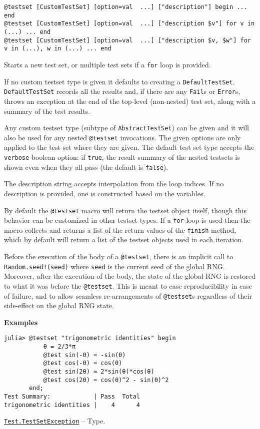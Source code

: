 \begin{adjustwidth}{2em}{0pt}


\begin{verbatim}
@testset [CustomTestSet] [option=val  ...] ["description"] begin ... end
@testset [CustomTestSet] [option=val  ...] ["description $v"] for v in (...) ... end
@testset [CustomTestSet] [option=val  ...] ["description $v, $w"] for v in (...), w in (...) ... end
\end{verbatim}

Starts a new test set, or multiple test sets if a \texttt{for} loop is provided.

If no custom testset type is given it defaults to creating a \texttt{DefaultTestSet}. \texttt{DefaultTestSet} records all the results and, if there are any \texttt{Fail}s or \texttt{Error}s, throws an exception at the end of the top-level (non-nested) test set, along with a summary of the test results.

Any custom testset type (subtype of \texttt{AbstractTestSet}) can be given and it will also be used for any nested \texttt{@testset} invocations. The given options are only applied to the test set where they are given. The default test set type accepts the \texttt{verbose} boolean option: if \texttt{true}, the result summary of the nested testsets is shown even when they all pass (the default is \texttt{false}).

The description string accepts interpolation from the loop indices. If no description is provided, one is constructed based on the variables.

By default the \texttt{@testset} macro will return the testset object itself, though this behavior can be customized in other testset types. If a \texttt{for} loop is used then the macro collects and returns a list of the return values of the \texttt{finish} method, which by default will return a list of the testset objects used in each iteration.

Before the execution of the body of a \texttt{@testset}, there is an implicit call to \texttt{Random.seed!(seed)} where \texttt{seed} is the current seed of the global RNG. Moreover, after the execution of the body, the state of the global RNG is restored to what it was before the \texttt{@testset}. This is meant to ease reproducibility in case of failure, and to allow seamless re-arrangements of \texttt{@testset}s regardless of their side-effect on the global RNG state.

\textbf{Examples}


\begin{verbatim}
julia> @testset "trigonometric identities" begin
           θ = 2/3*π
           @test sin(-θ) ≈ -sin(θ)
           @test cos(-θ) ≈ cos(θ)
           @test sin(2θ) ≈ 2*sin(θ)*cos(θ)
           @test cos(2θ) ≈ cos(θ)^2 - sin(θ)^2
       end;
Test Summary:            | Pass  Total
trigonometric identities |    4      4
\end{verbatim}



\end{adjustwidth}
\hypertarget{12890980963091972197}{}
\hyperlink{12890980963091972197}{\texttt{Test.TestSetException}}  -- {Type.}

